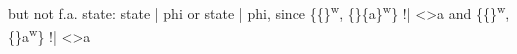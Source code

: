 \documentclass[landscape, a4paper]{article}
\begin{document}
\begin{minipage}[t]{0.19\linewidth}
\begin{betterlist}
\begin{betterlist}
			\item but not f.a. state: state |\raisebox{0.4mm}{=} phi or state |\raisebox{0.4mm}{=} \raisebox{-0.5mm}{\~{}}phi, since \{\{\}\textsuperscript{w}, \{\}\{a\}\textsuperscript{w}\} !|\raisebox{0.4mm}{=} <>a and \{\{\}\textsuperscript{w}, \{\}{a}\textsuperscript{w}\} !|\raisebox{0.4mm}{=} \raisebox{-0.5mm}{\~{}}<>a
		\end{betterlist}
	\end{betterlist}
	\begin{betterlist}

\end{betterlist}
\end{minipage}
\end{document}
